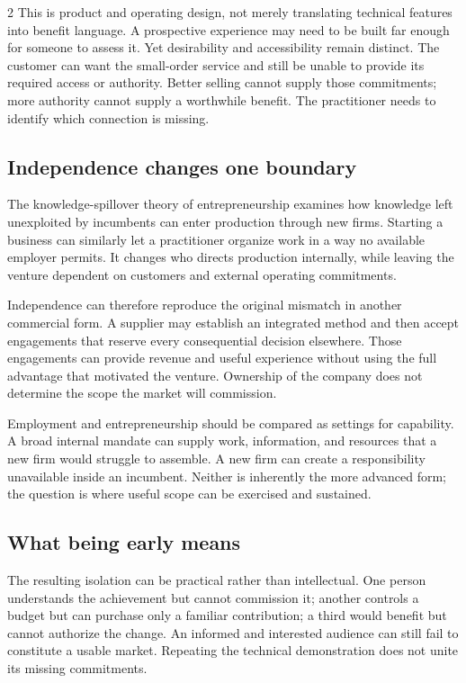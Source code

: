 \begin{multicols}{2}
This is product and operating design, not merely translating technical
features into benefit language. A prospective experience may need to be
built far enough for someone to assess it. Yet desirability and
accessibility remain distinct. The customer can want the small-order
service and still be unable to provide its required access or authority.
Better selling cannot supply those commitments; more authority cannot
supply a worthwhile benefit. The practitioner needs to identify which
connection is missing.

\subsection{Independence changes one
boundary}\label{independence-changes-one-boundary}

The knowledge-spillover theory of entrepreneurship
\citep{acs2009spillover} examines how knowledge left unexploited by
incumbents can enter production through new firms. Starting a business
can similarly let a practitioner organize work in a way no available
employer permits. It changes who directs production internally, while
leaving the venture dependent on customers and external operating
commitments.

Independence can therefore reproduce the original mismatch in another
commercial form. A supplier may establish an integrated method and then
accept engagements that reserve every consequential decision elsewhere.
Those engagements can provide revenue and useful experience without
using the full advantage that motivated the venture. Ownership of the
company does not determine the scope the market will commission.

Employment and entrepreneurship should be compared as settings for
capability. A broad internal mandate can supply work, information, and
resources that a new firm would struggle to assemble. A new firm can
create a responsibility unavailable inside an incumbent. Neither is
inherently the more advanced form; the question is where useful scope
can be exercised and sustained.

\subsection{What being early means}\label{what-being-early-means}

The resulting isolation can be practical rather than intellectual. One
person understands the achievement but cannot commission it; another
controls a budget but can purchase only a familiar contribution; a third
would benefit but cannot authorize the change. An informed and
interested audience can still fail to constitute a usable market.
Repeating the technical demonstration does not unite its missing
commitments.


\end{multicols}
